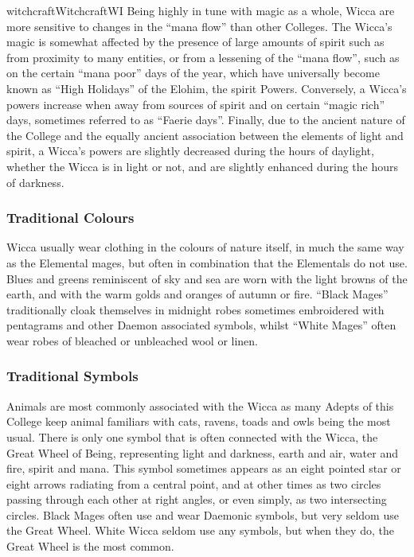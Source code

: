 \begin{college}[1.1]{witchcraft}{Witchcraft}{WI}
Being highly in tune with magic as a whole, Wicca are more sensitive
to changes in the ``mana flow'' than other Colleges.  The Wicca's
magic is somewhat affected by the presence of large amounts of spirit
such as from proximity to many entities, or from a lessening of the
``mana flow'', such as on the certain ``mana poor'' days of the year,
which have universally become known as ``High Holidays'' of the
Elohim, the spirit Powers.  Conversely, a Wicca's powers increase when
away from sources of spirit and on certain ``magic rich'' days,
sometimes referred to as ``Faerie days''.  Finally, due to the ancient
nature of the College and the equally ancient association between the
elements of light and spirit, a Wicca's powers are slightly decreased
during the hours of daylight, whether the Wicca is in light or not,
and are slightly enhanced during the hours of darkness.

\subsubsection{Traditional Colours}

Wicca usually wear clothing in the colours of nature itself, in much
the same way as the Elemental mages, but often in combination that the
Elementals do not use.  Blues and greens reminiscent of sky and sea
are worn with the light browns of the earth, and with the warm golds
and oranges of autumn or fire.  ``Black Mages'' traditionally cloak
themselves in midnight robes sometimes embroidered with pentagrams and
other Daemon associated symbols, whilst ``White Mages'' often wear
robes of bleached or unbleached wool or linen.

\subsubsection{Traditional Symbols}

Animals are most commonly associated with the Wicca as many Adepts of
this College keep animal familiars with cats, ravens, toads and owls
being the most usual.  There is only one symbol that is often
connected with the Wicca, the Great Wheel of Being, representing light
and darkness, earth and air, water and fire, spirit and mana.  This
symbol sometimes appears as an eight pointed star or eight arrows
radiating from a central point, and at other times as two circles
passing through each other at right angles, or even simply, as two
intersecting circles.  Black Mages often use and wear Daemonic
symbols, but very seldom use the Great Wheel.  White Wicca seldom use
any symbols, but when they do, the Great Wheel is the most common.



\end{college}
